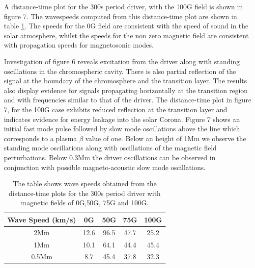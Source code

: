 \documentclass[linenumbers]{aastex63}
\begin{document}

A distance-time plot for the 300s period driver, with the 100G field is shown in figure 7. The wavespeeds computed from this distance-time plot are shown in table \ref{Tablewavespeeds_300s}. The speeds for the 0G field are consistent with the speed of sound in the solar atmosphere, whilst the speeds for the non zero magnetic field are consistent with propagation speeds for magnetosonic modes.

Investigation of figure 6 reveals excitation from the driver along with standing oscillations in the chromospheric cavity. There is also partial reflection of the signal at the boundary of the chromosphere and the transition layer. The results also display evidence for signals propagating horizontally at the transition region and with frequencies similar to that of the driver. The distance-time plot in figure 7, for the 100G case exhibits reduced reflection at the transition layer and indicates evidence for energy leakage into the solar Corona. Figure 7 shows an initial fast mode pulse followed by slow mode oscillations above the line which corresponds to a plasma  $\beta$ value of one. Below an height of 1Mm we observe the standing mode oscillations along with oscillations of the magnetic field perturbations. Below 0.3Mm the driver oscillations can be observed in conjunction with possible magneto-acoustic slow mode oscillations.
\begin{table}\label{wavespeeds}
\centering
\begin{tabular}{c c c c c}
\hline
Wave Speed (km/s)   &  0G  &  50G &  75G & 100G\\
\hline
2Mm & 12.6  &   96.5       &   47.7      &  25.2     \\
\hline
1Mm & 10.1  &    64.1      &   44.4     &   45.4      \\
\hline
0.5Mm & 8.7  &   45.4      &   37.8      &   32.3    \\
\hline

\end{tabular} 
\caption{The table shows wave speeds obtained from the distance-time plots for the 300s period driver with magnetic fields of 0G,50G, 75G and 100G.}
\label{Tablewavespeeds_300s}
\end{table}
\end{document}
